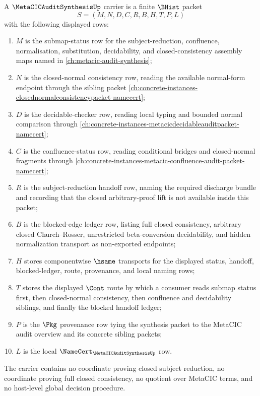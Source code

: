 \begin{definition}
\label{def:metacic-audit-synthesis-carrier}
A $\MetaCICAuditSynthesisUp$ carrier is a finite $\BHist$ packet
$$
S=(M,N,D,C,R,B,H,T,P,L)
$$
with the following displayed rows:
\begin{enumerate}
\item $M$ is the submap-status row for the subject-reduction, confluence, normalisation, substitution, decidability, and closed-consistency assembly maps named in \autoref{ch:metacic-audit-synthesis};
\item $N$ is the closed-normal consistency row, reading the available normal-form endpoint through the sibling packet \autoref{ch:concrete-instances-closednormalconsistencypacket-namecert};
\item $D$ is the decidable-checker row, reading local typing and bounded normal comparison through \autoref{ch:concrete-instances-metacicdecidableauditpacket-namecert};
\item $C$ is the confluence-status row, reading conditional bridges and closed-normal fragments through \autoref{ch:concrete-instances-metacic-confluence-audit-packet-namecert};
\item $R$ is the subject-reduction handoff row, naming the required discharge bundle and recording that the closed arbitrary-proof lift is not available inside this packet;
\item $B$ is the blocked-edge ledger row, listing full closed consistency, arbitrary closed Church--Rosser, unrestricted beta-conversion decidability, and hidden normalization transport as non-exported endpoints;
\item $H$ stores componentwise $\hsame$ transports for the displayed status, handoff, blocked-ledger, route, provenance, and local naming rows;
\item $T$ stores the displayed $\Cont$ route by which a consumer reads submap status first, then closed-normal consistency, then confluence and decidability siblings, and finally the blocked handoff ledger;
\item $P$ is the $\Pkg$ provenance row tying the synthesis packet to the MetaCIC audit overview and its concrete sibling packets;
\item $L$ is the local $\NameCert_{\MetaCICAuditSynthesisUp}$ row.
\end{enumerate}
The carrier contains no coordinate proving closed subject reduction, no coordinate proving full closed consistency, no quotient over MetaCIC terms, and no host-level global decision procedure.
\end{definition}

